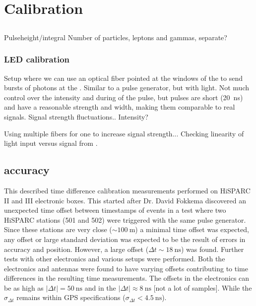 \chapter{Calibration}
\label{ch:calibration}

\section{\pmt}
\label{sec:pmt}

Pulseheight/integral
Number of particles, leptons and gammas, separate?


\subsection{LED calibration}
\label{sub:led_calibration}

Setup where we can use an optical fiber pointed at the windows of the
\pmt to send bursts of photons at the \pmt. Similar to a pulse
generator, but with light. Not much control over the intensity and
during of the pulse, but pulses are short (\SI{20}{\nano\second}) and
have a reasonable strength and width, making them comparable to real
signals. Signal strength fluctuations..
Intensity?

Using multiple fibers for one \pmt to increase signal strength...
Checking linearity of light input versus signal from \pmt.


\section{\gps accuracy}
\label{sec:gps_accuracy}

This described time difference calibration measurements performed on
HiSPARC II and III electronic boxes. This started after Dr. David
Fokkema discovered an unexpected time offset between timestamps of
events in a test where two HiSPARC stations (501 and 502) were triggered
with the same pulse generator. Since these stations are very close
($\sim\SI{100}{\meter}$) a minimal time offset was expected, any offset
or large standard deviation was expected to be the result of errors in
\gps accuracy and position. However, a large offset ($\Delta t
\sim\SI{18}{\nano\second}$) was found. Further tests with other \hisparc
electronics and various setups were performed. Both the \hisparc
electronics and \gps antennas were found to have varying offsets
contributing to time differences in the resulting time measurements. The
offsets in the \hisparc electronics can be as high as $|\Delta t| =
\SI{50}{\nano\second}$ and in the \gps $|\Delta t| \approx
\SI{8}{\nano\second}$ [not a lot of samples]. While the $\sigma_{\Delta
t}$ remains within GPS specifications ($\sigma_{\Delta t} <
\SI{4.5}{\nano\second}$).


